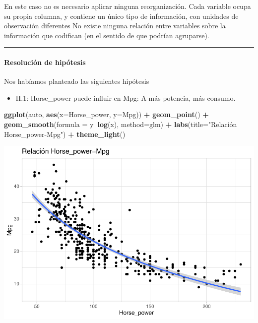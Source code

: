 \documentclass[
]{article}
\newenvironment{Shaded}{\begin{snugshade}}{\end{snugshade}}
\newcommand{\DataTypeTok}[1]{\textcolor[rgb]{0.13,0.29,0.53}{#1}}
\newcommand{\KeywordTok}[1]{\textcolor[rgb]{0.13,0.29,0.53}{\textbf{#1}}}
\newcommand{\NormalTok}[1]{#1}
\newcommand{\OperatorTok}[1]{\textcolor[rgb]{0.81,0.36,0.00}{\textbf{#1}}}
\newcommand{\StringTok}[1]{\textcolor[rgb]{0.31,0.60,0.02}{#1}}
\providecommand{\tightlist}{%
  \setlength{\itemsep}{0pt}\setlength{\parskip}{0pt}}
\begin{document}
En este caso no es necesario aplicar ninguna reorganización. Cada
variable ocupa su propia columna, y contiene un único tipo de
información, con unidades de observación diferentes No existe ninguna
relación entre variables sobre la información que codifican (en el
sentido de que podrían agruparse).

\begin{center}\rule{0.5\linewidth}{0.5pt}\end{center}

\hypertarget{resoluciuxf3n-de-hipuxf3tesis}{%
\paragraph{Resolución de
hipótesis}\label{resoluciuxf3n-de-hipuxf3tesis}}

Nos habíamos planteado las siguientes hipótesis

\begin{itemize}
\tightlist
\item
  H.1: Horse\_power puede influir en Mpg: A más potencia, más consumo.
\end{itemize}

\begin{Shaded}
\begin{Highlighting}[]
\KeywordTok{ggplot}\NormalTok{(auto, }\KeywordTok{aes}\NormalTok{(}\DataTypeTok{x=}\NormalTok{Horse_power, }\DataTypeTok{y=}\NormalTok{Mpg)) }\OperatorTok{+}
\StringTok{  }\KeywordTok{geom_point}\NormalTok{() }\OperatorTok{+}
\StringTok{  }\KeywordTok{geom_smooth}\NormalTok{(}\DataTypeTok{formula =}\NormalTok{ y}\OperatorTok{~}\KeywordTok{log}\NormalTok{(x), }\DataTypeTok{method=}\NormalTok{glm) }\OperatorTok{+}
\StringTok{  }\KeywordTok{labs}\NormalTok{(}\DataTypeTok{title=}\StringTok{"Relación Horse_power-Mpg"}\NormalTok{) }\OperatorTok{+}
\StringTok{  }\KeywordTok{theme_light}\NormalTok{()}
\end{Highlighting}
\end{Shaded}

\begin{center}\includegraphics{EDA_files/figure-latex/unnamed-chunk-27-1} \end{center}
\end{document}

